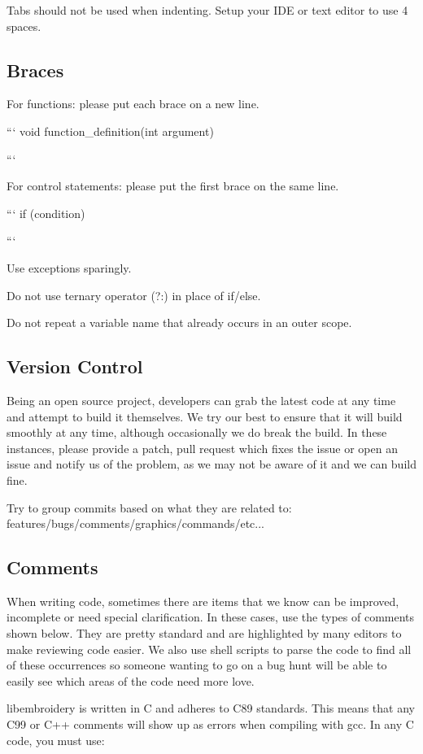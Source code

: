 \documentclass[a4paper]{report}
\begin{document}
Tabs should not be used when indenting. Setup your IDE or text editor to
use 4 spaces.

\subsection{Braces}

For functions: please put each brace on a new line.

```
void function\_definition(int argument)
{

}
```

For control statements: please put the first brace on the same line.

```
if (condition) {

}
```

Use exceptions sparingly.

Do not use ternary operator (?:) in place of if/else.

Do not repeat a variable name that already occurs in an outer scope.

\subsection{Version Control}

Being an open source project, developers can grab the latest code at any
time and attempt to build it themselves. We try our best to ensure that
it will build smoothly at any time, although occasionally we do break
the build. In these instances, please provide a patch, pull request
which fixes the issue or open an issue and notify us of the problem, as
we may not be aware of it and we can build fine.

Try to group commits based on what they are related to:
features/bugs/comments/graphics/commands/etc...

\subsection{Comments}

When writing code, sometimes there are items that we know can be
improved, incomplete or need special clarification. In these cases, use
the types of comments shown below. They are pretty standard and are
highlighted by many editors to make reviewing code easier. We also use
shell scripts to parse the code to find all of these occurrences so
someone wanting to go on a bug hunt will be able to easily see which
areas of the code need more love.

libembroidery is written in C and adheres to C89 standards. This means
that any C99 or C++ comments will show up as errors when compiling with
gcc. In any C code, you must use:
\end{document}
